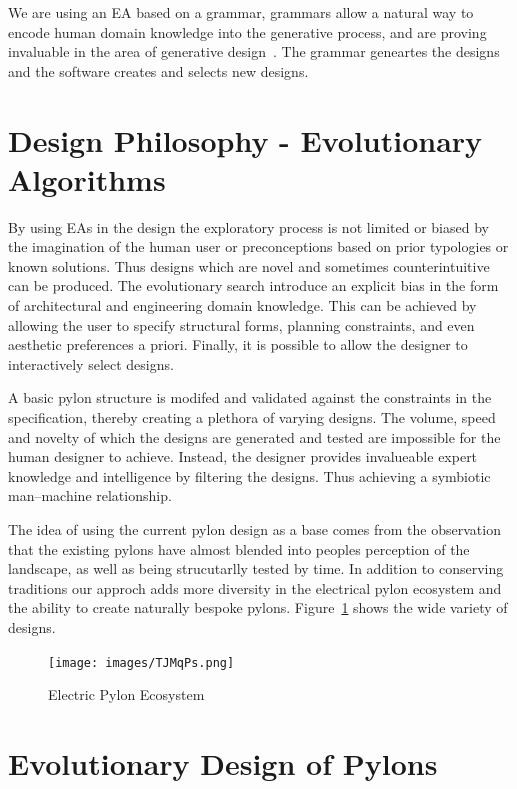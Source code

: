 \documentclass{sig-alternate}
\begin{document}
We are using an EA based on a grammar, grammars allow a natural way to
encode human domain knowledge into the generative process, and are
proving invaluable in the area of generative
design~\cite{oneill2010}. The grammar geneartes the designs and the
software creates and selects new designs.

\section*{Design Philosophy - Evolutionary Algorithms}
By using EAs in the design the exploratory process is not limited or
biased by the imagination of the human user or preconceptions based on
prior typologies or known solutions. Thus designs which are novel and
sometimes counterintuitive can be produced. The evolutionary search
introduce an explicit bias in the form of architectural and
engineering domain knowledge. This can be achieved by allowing the
user to specify structural forms, planning constraints, and even
aesthetic preferences a priori. Finally, it is possible to allow the
designer to interactively select designs.

A basic pylon structure is modifed and validated against the
constraints in the specification, thereby creating a plethora of
varying designs. The volume, speed and novelty of which the designs
are generated and tested are impossible for the human designer to
achieve. Instead, the designer provides invalueable expert knowledge
and intelligence by filtering the designs. Thus achieving a
symbiotic man--machine relationship.

The idea of using the current pylon design as a base comes from the
observation that the existing pylons have almost blended into peoples
perception of the landscape, as well as being strucutarlly tested by
time. In addition to conserving traditions our approch adds more
diversity in the electrical pylon ecosystem and the ability to create
naturally bespoke pylons. Figure~\ref{fig:pylon_montage} shows the
wide variety of designs.

\begin{figure}
\centering
  \texttt{[image: images/TJMqPs.png]}
  \caption{Electric Pylon Ecosystem}
  \label{fig:pylon_montage}
\end{figure}

\section*{Evolutionary Design of Pylons}
\end{document}
